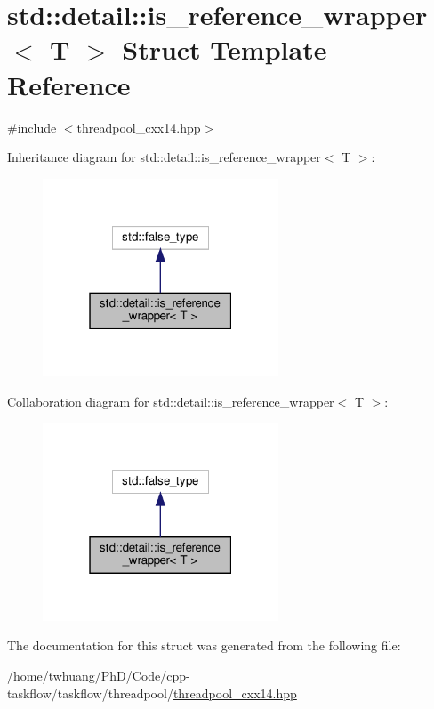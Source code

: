 \hypertarget{structstd_1_1detail_1_1is__reference__wrapper}{}\section{std\+:\+:detail\+:\+:is\+\_\+reference\+\_\+wrapper$<$ T $>$ Struct Template Reference}
\label{structstd_1_1detail_1_1is__reference__wrapper}


{\ttfamily \#include $<$threadpool\+\_\+cxx14.\+hpp$>$}



Inheritance diagram for std\+:\+:detail\+:\+:is\+\_\+reference\+\_\+wrapper$<$ T $>$\+:\nopagebreak
\begin{figure}[H]
\begin{center}
\leavevmode
\includegraphics[width=199pt]{structstd_1_1detail_1_1is__reference__wrapper__inherit__graph}
\end{center}
\end{figure}


Collaboration diagram for std\+:\+:detail\+:\+:is\+\_\+reference\+\_\+wrapper$<$ T $>$\+:\nopagebreak
\begin{figure}[H]
\begin{center}
\leavevmode
\includegraphics[width=199pt]{structstd_1_1detail_1_1is__reference__wrapper__coll__graph}
\end{center}
\end{figure}


The documentation for this struct was generated from the following file\+:\begin{DoxyCompactItemize}
\item 
/home/twhuang/\+Ph\+D/\+Code/cpp-\/taskflow/taskflow/threadpool/\hyperlink{threadpool__cxx14_8hpp}{threadpool\+\_\+cxx14.\+hpp}\end{DoxyCompactItemize}

